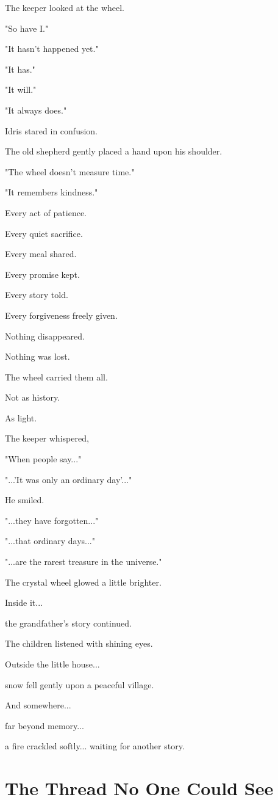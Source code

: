 \documentclass[12pt,openany]{book}
\begin{document}
The keeper looked at the wheel.

"So have I."

"It hasn't happened yet."

"It has."

"It will."

"It always does."

Idris stared in confusion.

The old shepherd gently placed a hand upon his shoulder.

"The wheel doesn't measure time."

"It remembers kindness."

Every act of patience.

Every quiet sacrifice.

Every meal shared.

Every promise kept.

Every story told.

Every forgiveness freely given.

Nothing disappeared.

Nothing was lost.

The wheel carried them all.

Not as history.

As light.

The keeper whispered,

"When people say..."

"...'It was only an ordinary day'..."

He smiled.

"...they have forgotten..."

"...that ordinary days..."

"...are the rarest treasure in the universe."

The crystal wheel glowed a little brighter.

Inside it...

the grandfather's story continued.

The children listened with shining eyes.

Outside the little house...

snow fell gently upon a peaceful village.

And somewhere...

far beyond memory...

a fire crackled softly...
waiting for another story.
\section*{The Thread No One Could See}
\end{document}
